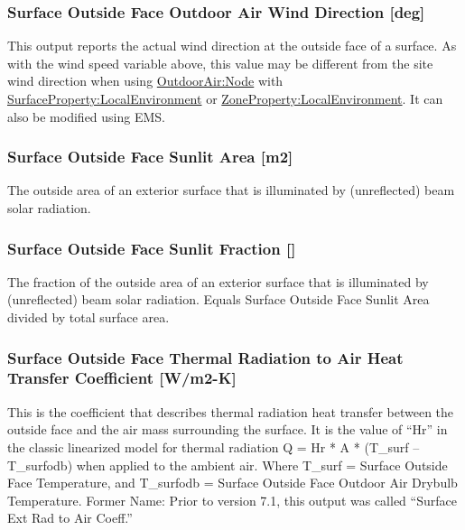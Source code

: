 \subsubsection{Surface Outside Face Outdoor Air Wind Direction {[}deg{]}}\label{surface-outside-face-outdoor-air-wind-direction-def}

This output reports the actual wind direction at the outside face of a surface.  As with the wind speed variable above, this value may be different from the site wind direction when using \hyperref[outdoorairnode]{OutdoorAir:Node} with \hyperref[surfacePropertylocalEnvironment]{SurfaceProperty:LocalEnvironment} or \hyperref[ZonePropertylocalEnvironment]{ZoneProperty:LocalEnvironment}. It can also be modified using EMS.

\subsubsection{Surface Outside Face Sunlit Area {[}m2{]}}\label{surface-outside-face-sunlit-area-m2}

The outside area of an exterior surface that is illuminated by (unreflected) beam solar radiation.

\subsubsection{Surface Outside Face Sunlit Fraction {[]}}\label{surface-outside-face-sunlit-fraction}

The fraction of the outside area of an exterior surface that is illuminated by (unreflected) beam solar radiation. Equals Surface Outside Face Sunlit Area divided by total surface area.

\subsubsection{Surface Outside Face Thermal Radiation to Air Heat Transfer Coefficient {[}W/m2-K{]}}\label{surface-outside-face-thermal-radiation-to-air-heat-transfer-coefficient-wm2-k}

This is the coefficient that describes thermal radiation heat transfer between the outside face and the air mass surrounding the surface. It is the value of ``Hr'' in the classic linearized model for thermal radiation Q = Hr * A * (T\_surf -- T\_surfodb) when applied to the ambient air. Where T\_surf = Surface Outside Face Temperature, and T\_surfodb = Surface Outside Face Outdoor Air Drybulb Temperature. Former Name: Prior to version 7.1, this output was called ``Surface Ext Rad to Air Coeff.''

